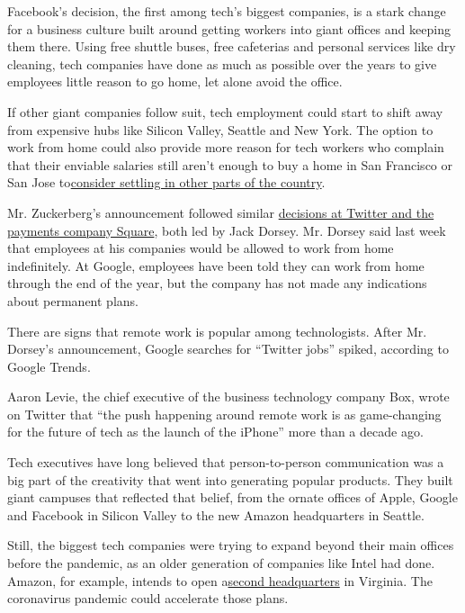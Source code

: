 Facebook's decision, the first among tech's biggest companies, is a
stark change for a business culture built around getting workers into
giant offices and keeping them there. Using free shuttle buses, free
cafeterias and personal services like dry cleaning, tech companies have
done as much as possible over the years to give employees little reason
to go home, let alone avoid the office.

If other giant companies follow suit, tech employment could start to
shift away from expensive hubs like Silicon Valley, Seattle and New
York. The option to work from home could also provide more reason for
tech workers who complain that their enviable salaries still aren't
enough to buy a home in San Francisco or San Jose
to\href{https://www.nytimes.com/2019/05/09/technology/uber-lyft-low-tax-millennials.html}{consider
settling in other parts of the country}.

Mr. Zuckerberg's announcement followed similar
\href{https://www.nytimes.com/2020/05/08/technology/coronavirus-work-from-home.html}{decisions
at Twitter and the payments company Square}, both led by Jack Dorsey.
Mr. Dorsey said last week that employees at his companies would be
allowed to work from home indefinitely. At Google, employees have been
told they can work from home through the end of the year, but the
company has not made any indications about permanent plans.

There are signs that remote work is popular among technologists. After
Mr. Dorsey's announcement, Google searches for ``Twitter jobs'' spiked,
according to Google Trends.

Aaron Levie, the chief executive of the business technology company Box,
wrote on Twitter that ``the push happening around remote work is as
game-changing for the future of tech as the launch of the iPhone'' more
than a decade ago.

Tech executives have long believed that person-to-person communication
was a big part of the creativity that went into generating popular
products. They built giant campuses that reflected that belief, from the
ornate offices of Apple, Google and Facebook in Silicon Valley to the
new Amazon headquarters in Seattle.

Still, the biggest tech companies were trying to expand beyond their
main offices before the pandemic, as an older generation of companies
like Intel had done. Amazon, for example, intends to open
a\href{https://www.nytimes.com/2019/02/14/nyregion/amazon-hq2-queens.html}{second
headquarters} in Virginia. The coronavirus pandemic could accelerate
those plans.

